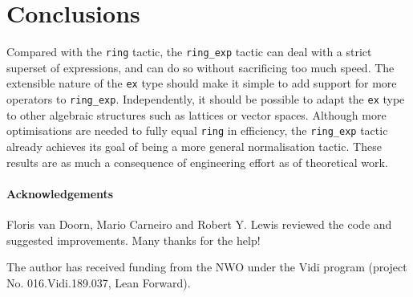 \documentclass{llncs}
\newcommand{\lean}[1]{\texttt{#1}\xspace} %
\newcommand{\ex}{\lean{ex}}
\newcommand{\ring}{\lean{ring}}
\newcommand{\ringexp}{\lean{ring\_exp}}
\begin{document}
% 

%
%


\section{Conclusions}
Compared with the \ring tactic, the \ringexp tactic can deal with a strict superset of expressions,
and can do so without sacrificing too much speed.
The extensible nature of the \ex type should make it simple to add support for more operators to \ringexp.
Independently, it should be possible to adapt the \ex type to other algebraic structures
such as lattices or vector spaces.
Although more optimisations are needed to fully equal \ring in efficiency,
the \ringexp tactic already achieves its goal of being a more general normalisation tactic.
These results are as much a consequence of engineering effort as of theoretical work.


\paragraph{Acknowledgements}
Floris van Doorn, Mario Carneiro and Robert Y. Lewis reviewed the code and
suggested improvements. Many thanks for the help!

The author has received funding from the NWO under the Vidi program (project
No. 016.Vidi.189.037, Lean Forward).

\printbibliography
\end{document}
